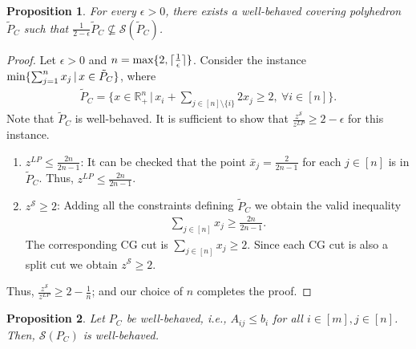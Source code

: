 \documentclass[11pt]{article}
\newcommand{\R}{\mathbb{R}}
\newcommand{\seq}{\subseteq}
\renewcommand{\S}{\mathcal{S}}
\newtheorem{proposition}{Proposition}
\begin{document}
\begin{proposition} 
\label{prop:LBAC}
For every $\epsilon >0$, there exists a well-behaved covering polyhedron $\tilde{P}_C$ such that $\frac{1}{2-\epsilon} \tilde{P}_C  \not \seq \S(\tilde{P}_C)$.
\end{proposition}

\begin{proof} 
Let $\epsilon >0$ and $n = \textup{max}\{2,\lceil \frac{1}{\epsilon}\rceil\}$.
Consider the instance 
$\textup{min} \{ \sum_{j = 1}^n x_j \,|\, x \in \tilde{P}_C\}$, where 
\begin{align*}
\tilde{P}_C = \{x \in \R^n_+ \,|\, x_i + \displaystyle \sum_{j \in [n]\setminus \{i\}} 2x_j \geq 2, \ \forall i \in [n]\}.
\end{align*}
Note that $\tilde{P}_C$ is well-behaved.
It is sufficient to show that 
$\frac{z^{\S}}{z^{LP}} \geq 2 - \epsilon$
for this instance. 

\begin{enumerate}
\item 
$z^{LP} \le \frac{2n}{2n - 1}$: 
It can be checked that the point $\bar x_j = \frac{2}{2n - 1}$ for each $j \in [n]$ is in 
$\tilde{P}_C$. Thus, $z^{LP} \le \frac{2n}{2n - 1}$. 
\item 
$z^{\S} \geq 2$: 
Adding all the constraints defining $\tilde{P}_C$ we obtain the valid inequality
\begin{eqnarray*} %
\sum_{j \in [n]} x_j \geq \frac{2n}{2n - 1}.
\end{eqnarray*}  
The corresponding CG cut is $\sum_{j \in [n]} x_j \geq 2$. Since each CG cut is also a split cut we obtain $z^{\S} \geq 2$.
\end{enumerate}
Thus, 
$\frac{z^{\S}}{z^{LP}} \geq 2 - \frac{1}{n}$; and our choice of $n$ completes the proof. 
\end{proof}
\begin{proposition}
\label{prop:CoveringSplitWell}
Let  $P_C$ be well-behaved, i.e., $A_{ij} \leq b_i$ for all $i \in [m], j \in [n]$. Then, $\S(P_C)$ is well-behaved.
\end{proposition}
\end{document}
